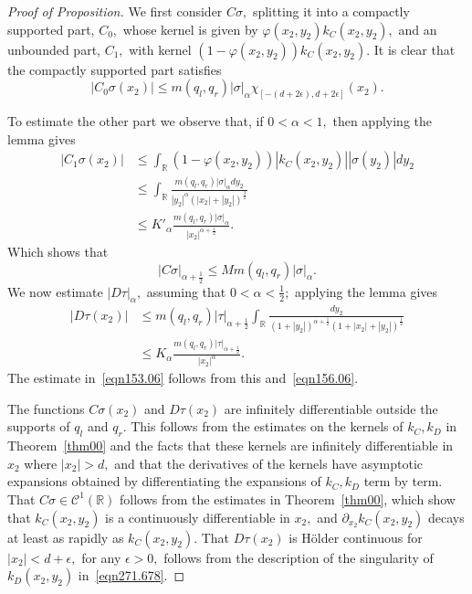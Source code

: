 \documentclass[11pt]{article}
\newcommand{\Bk}{\color{black}}
\newcommand{\Rd}{\color{black}}
\newcommand\cC{\mathcal{C}}
\newcommand\bbR{\mathbb R}
\newcommand\pa{\partial}
\theoremstyle{definition}
\theoremstyle{remark}
\begin{document}
 
   \begin{proof}[Proof of Proposition]

 

     We first consider $C\sigma,$ splitting it into a compactly supported
     part, $C_0,$ whose kernel is given by $\varphi(x_2,y_2) k_C(x_2,y_2),$ and
     an unbounded part, $C_1,$ with kernel $(1-\varphi(x_2,y_2))k_C(x_2,y_2).$ It is clear
     that the compactly supported part satisfies
   \begin{equation}
     |C_0\sigma(x_2)|\leq m(q_l,q_r) |\sigma|_{\alpha}\chi_{[-(d+2\epsilon),d+2\epsilon]}(x_2).
   \end{equation}
   

   To estimate the other part we observe that, if $0<\alpha<1,$ then
   applying the lemma gives
   \begin{equation}
     \begin{split}
       |C_1\sigma(x_2)|&\leq\int_{\bbR}(1-\varphi(x_2,y_2))|k_C(x_2,y_2)||\sigma(y_2)|dy_2\\
       &\leq \int_{\bbR}\frac{m(q_l,q_r)|\sigma|_{\alpha} 
         dy_2}{|y_2|^{\alpha}(|x_2|+|y_2|)^{\frac 32}}\\
            &\leq K'_{\alpha}\frac{m(q_l,q_r)|\sigma|_{\alpha}}{|x_2|^{\alpha+\frac 12}}.
     \end{split}
   \end{equation}
     Which shows that
    \begin{equation}\label{eqn156.06}
     |C\sigma|_{\alpha+\frac 12}\leq M m(q_l,q_r)|\sigma|_{\alpha}.
   \end{equation}
   We now estimate $|D\tau|_{\alpha},$ assuming that
   $0<\alpha<\frac 12;$ applying the lemma gives
   \begin{equation}
     \begin{split}
       |D\tau(x_2)|&\leq
       m(q_l,q_r)|\tau|_{\alpha+\frac 12}\int_{\bbR}\frac{dy_2}{(1+|y_2|)^{\alpha+\frac
           12}(1+|x_2|+|y_2|)^{\frac 12}}\\
       &\leq  K_{\alpha}\frac{m(q_l,q_r)|\tau|_{\alpha+\frac 12}}{|x_2|^{\alpha}}.
     \end{split}
   \end{equation}
   The estimate in~\eqref{eqn153.06} follows from this and~\eqref{eqn156.06}.

     \Rd The functions $C\sigma(x_2)$ and $D\tau(x_2)$ are infinitely
     differentiable outside the supports of $q_l$ and $q_r.$ This follows from
     the estimates on the kernels of $k_C, k_D$ in Theorem~\ref{thm00} and the
     facts that these kernels are infinitely differentiable in $x_2$ where
     $|x_2|>d,$ and that the derivatives of the kernels have asymptotic
     expansions obtained by differentiating the expansions of $k_C, k_D$ term by
     term.  That $C\sigma\in\cC^1(\bbR)$ follows from the estimates in
     Theorem~\ref{thm00}, which show that $k_C(x_2,y_2)$ is a continuously
     differentiable in $x_2,$ and $\pa_{x_2}k_C(x_2,y_2)$ decays at least as
     rapidly as $k_C(x_2,y_2).$ That $D\tau(x_2)$ is H\"older continuous for
     $|x_2|<d+\epsilon,$ for any $\epsilon>0,$ follows from the description of
     the singularity of $k_D(x_2,y_2)$ in~\eqref{eqn271.678}. \Bk


\end{proof}
\end{document}
